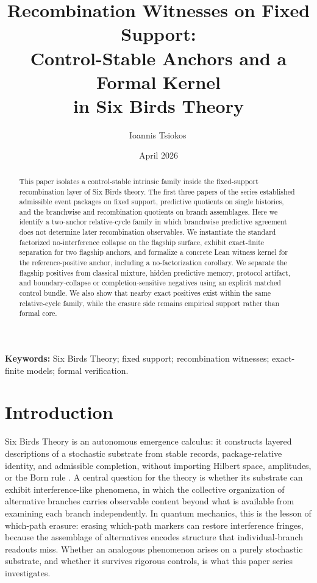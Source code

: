 \documentclass[11pt]{article}
\title{Recombination Witnesses on Fixed Support:\\Control-Stable Anchors and a Formal Kernel\\in Six Birds Theory}
\author{Ioannis Tsiokos\,\orcidlink{0009-0009-7659-5964}}
\date{April 2026}
\theoremstyle{definition}
\begin{document}
\maketitle
\thispagestyle{firstpage}

\begin{abstract}
This paper isolates a control-stable intrinsic family inside the fixed-support recombination layer of Six Birds theory. The first three papers of the series established admissible event packages on fixed support, predictive quotients on single histories, and the branchwise and recombination quotients on branch assemblages. Here we identify a two-anchor relative-cycle family in which branchwise predictive agreement does not determine later recombination observables. We instantiate the standard factorized no-interference collapse on the flagship surface, exhibit exact-finite separation for two flagship anchors, and formalize a concrete Lean witness kernel for the reference-positive anchor, including a no-factorization corollary. We separate the flagship positives from classical mixture, hidden predictive memory, protocol artifact, and boundary-collapse or completion-sensitive negatives using an explicit matched control bundle. We also show that nearby exact positives exist within the same relative-cycle family, while the erasure side remains empirical support rather than formal core.
\end{abstract}

\medskip
\noindent\textbf{Keywords:} Six Birds Theory; fixed support; recombination witnesses; exact-finite models; formal verification.

\section{Introduction}

Six Birds Theory is an autonomous emergence calculus: it constructs layered descriptions of a stochastic substrate from stable records, package-relative identity, and admissible completion, without importing Hilbert space, amplitudes, or the Born rule \cite{Tsiokos2026LocallyBoolean,Tsiokos2026HolonomyMemory}. A central question for the theory is whether its substrate can exhibit interference-like phenomena, in which the collective organization of alternative branches carries observable content beyond what is available from examining each branch independently. In quantum mechanics, this is the lesson of which-path erasure: erasing which-path markers can restore interference fringes, because the assemblage of alternatives encodes structure that individual-branch readouts miss. Whether an analogous phenomenon arises on a purely stochastic substrate, and whether it survives rigorous controls, is what this paper series investigates.
\end{document}
